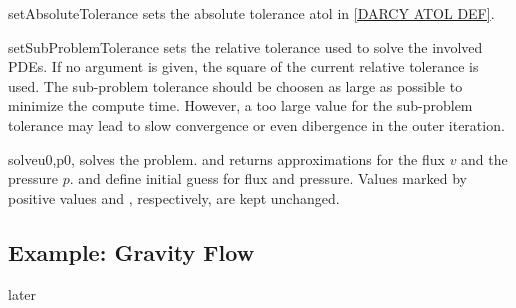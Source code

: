 \begin{methoddesc}[DarcyFlow]{setAbsoluteTolerance}{}
sets the absolute tolerance \mbox{atol} in \ref{DARCY ATOL DEF}.
\end{methoddesc}

\begin{methoddesc}[DarcyFlow]{setSubProblemTolerance}{}
sets the relative tolerance used to solve the involved PDEs. If no argument is given,
the square of the current relative tolerance is used. The sub-problem tolerance should be choosen as large as possible to minimize the compute time. However, a too large value for the sub-problem tolerance may lead to slow convergence or even dibergence in the outer iteration. 
\end{methoddesc}

\begin{methoddesc}[DarcyFlow]{solve}{u0,p0, }
solves the problem. and returns approximations for the flux $v$ and the pressure $p$. 
 and  define initial guess for flux and pressure. Values marked
by positive values  and , respectively, are kept unchanged.
\end{methoddesc}


\subsection{Example: Gravity Flow}
later





